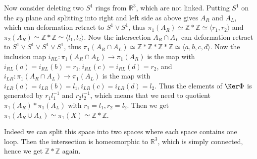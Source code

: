\begin{exmp} Now consider deleting two $S^1$ rings from $\mathbb{R}^3$, which are not linked. Putting $S^1$ on the $xy$ plane and splitting into right and left side as above gives $A_R$ and $A_L$, which can deformation retract to $S^1\vee S^1$, thus $\pi_1(A_R)\simeq \mathbb{Z}*\mathbb{Z}\simeq \langle r_1,r_2\rangle$ and $\pi_2(A_R)\simeq \mathbb{Z}*\mathbb{Z}\simeq \langle l_1,l_2\rangle$. Now the intersection $A_R\cap A_L$ can deformation retract to $S^1\vee S^1\vee S^1\vee S^1$, thus $\pi_1(A_R\cap A_L)\simeq \mathbb{Z}*\mathbb{Z}*\mathbb{Z}*\mathbb{Z}\simeq \langle a,b,c,d\rangle$. Now the inclusion map $i_{RL}:\pi_1(A_R\cap A_L)\rightarrow \pi_1(A_R)$ is the map with $i_{RL}(a)=i_{RL}(b)=r_1, i_{RL}(c)=i_{RL}(d)=r_2$, and $i_{LR}:\pi_1(A_R\cap A_L)\rightarrow \pi_1(A_L)$ is the map with $i_{LR}(a)=i_{LR}(b)=l_1, i_{LR}(c)=i_{LR}(d)=l_2$. Thus the elements of $\Ker \Phi$ is generated by $r_1l_1^{-1}$ and $r_2l_2^{-1}$, which means that we need to quotient  $\pi_1(A_R)*\pi_1(A_L)$ with $r_1=l_1, r_2=l_2$. Then we get $\pi_1(A_R\cup A_L)\simeq \pi_1(X)\simeq \mathbb{Z}*\mathbb{Z}$.

Indeed we can split this space into two spaces where each space contains one loop. Then the intersection is homeomorphic to $\mathbb{R}^3$, which is simply connected, hence we get $\mathbb{Z}*\mathbb{Z}$ again. 
\end{exmp}


